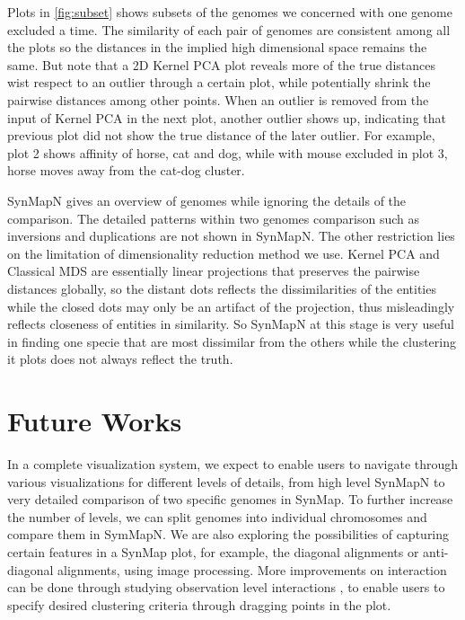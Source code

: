 \documentclass{vgtc}                      %
\begin{document}

Plots in \autoref{fig:subset} shows subsets of the genomes we concerned with one genome excluded a time. The similarity of each pair of genomes are consistent among all the plots so the distances in the implied high dimensional space remains the same. But note that a 2D Kernel PCA plot reveals more of the true distances wist respect to an outlier through a certain plot, while potentially shrink the pairwise distances among other points. When an outlier is removed from the input of Kernel PCA in the next plot, another outlier shows up, indicating that previous plot did not show the true distance of the later outlier. For example, plot 2 shows affinity of horse, cat and dog, while with mouse excluded in plot 3, horse moves away from the cat-dog cluster. 

SynMapN gives an overview of genomes while ignoring the details of the comparison. The detailed patterns within two genomes comparison such as inversions and duplications are not shown in SynMapN. The other restriction lies on the limitation of dimensionality reduction method we use. Kernel PCA and Classical MDS\cite{mds} are essentially linear projections that preserves the pairwise distances globally, so the distant dots reflects the dissimilarities of the entities while the closed dots may only be an artifact of the projection, thus misleadingly reflects closeness of entities in similarity. So SynMapN at this stage is very useful in finding one specie that are most dissimilar from the others while the clustering it plots does not always reflect the truth.




  
\section{Future Works}
In a complete visualization system, we expect to enable users to navigate through various visualizations for different levels of details, from high level SynMapN to very detailed comparison of two specific genomes in SynMap. To further increase the number of levels, we can split genomes into individual chromosomes and compare them in SymMapN. We are also exploring the possibilities of capturing certain features in a SynMap plot, for example, the diagonal alignments or anti-diagonal alignments, using image processing. More improvements on interaction can be done through studying observation level interactions \cite{endert2011observation}, to enable users to specify desired clustering criteria through dragging points in the plot. 
\end{document}
